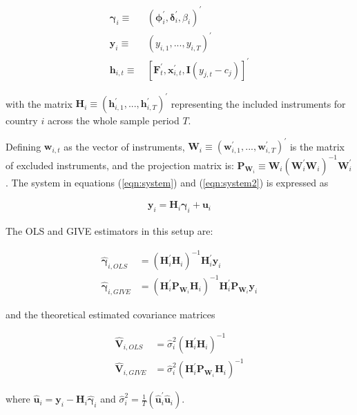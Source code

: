 \documentclass[../base.tex]{subfiles}
\begin{document}
\begin{align*}
 \boldsymbol{\gamma}_i \equiv&~ (\boldsymbol{\phi}_i^{\prime}, \boldsymbol{\delta}_{i}^{\prime}, \beta_i)^{\prime} \\
 \mathbf{y}_i \equiv&~ (y_{i,1},...,y_{i,T})^{\prime}\\
 \mathbf{h}_{i,t} \equiv&~ [\mathbf{F}_t^{\prime}, \mathbf{x}_{i,t}^{\prime}, \mathbf{I}(y_{j,t} - c_j)]^{\prime}
\end{align*}

with the matrix $\mathbf{H}_i \equiv (\mathbf{h}_{i,1}^{\prime},..., \mathbf{h}_{i,T}^{\prime})^{\prime}$ representing the included instruments for country $i$ across the whole sample period $T$. 

Defining $\mathbf{w}_{i,t}$ as the vector of instruments, $\mathbf{W}_i \equiv (\mathbf{w}_{i,1}^{\prime},..., \mathbf{w}_{i,T}^{\prime})^{\prime}$ is the matrix of excluded instruments, and the projection matrix is: $\mathbf{P}_{\mathbf{W}_i} \equiv \mathbf{W}_i (\mathbf{W}_i^{\prime} \mathbf{W}_i)^{-1} \mathbf{W}_i^{\prime}$. The system in equations (\ref{eqn:system}) and (\ref{eqn:system2}) is expressed as

\begin{align}
	\mathbf{y}_i = \mathbf{H}_i \boldsymbol{\gamma}_i + \mathbf{u}_i \label{eqn:matrix_system}
\end{align}

The OLS and GIVE estimators in this setup are:

\begin{align}
	\hat{\boldsymbol{\gamma}}_{i, OLS} &= (\mathbf{H}_i^{\prime} \mathbf{H}_i)^{-1} \mathbf{H}_i^{\prime} \mathbf{y}_i	\label{eqn:ols}\\	
	\hat{\boldsymbol{\gamma}}_{i, GIVE} &= (\mathbf{H}_i^{\prime} \mathbf{P}_{\mathbf{W}_i} \mathbf{H}_i)^{-1} \mathbf{H}_i^{\prime} \mathbf{P}_{\mathbf{W}_i} \mathbf{y}_i \label{eqn:give}	
\end{align}

and the theoretical estimated covariance matrices

\begin{align*}
	\hat{\mathbf{V}}_{i, OLS} &= \hat{\sigma}^2_i (\mathbf{H}_i^{\prime} \mathbf{H}_i)^{-1} \\
	\hat{\mathbf{V}}_{i, GIVE} &= \hat{\sigma}^2_i (\mathbf{H}_i^{\prime} \mathbf{P}_{\mathbf{W}_i} \mathbf{H}_i)^{-1}
\end{align*}


where $\hat{\mathbf{u}}_i = \mathbf{y}_i - \mathbf{H}_i \hat{\boldsymbol{\gamma}}_i$ and $\hat{\sigma}^2_i = \frac{1}{T} (\hat{\mathbf{u}}_i^{\prime} \hat{\mathbf{u}}_i)$. 
\end{document}
